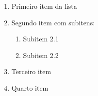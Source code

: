 
\begin{enumerate}
    \item Primeiro item da lista
    \item Segundo item com subitens:
    \begin{enumerate}
        \item Subitem 2.1
        \item Subitem 2.2
    \end{enumerate}
    \item Terceiro item
    \item Quarto item
\end{enumerate}




